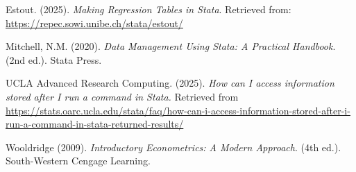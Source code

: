 \documentclass[
]{book}
\begin{document}
Estout. (2025). \emph{Making Regression Tables in Stata}. Retrieved from: \url{https://repec.sowi.unibe.ch/stata/estout/}

Mitchell, N.M. (2020). \emph{Data Management Using Stata: A Practical Handbook}. (2nd ed.). Stata Press.

UCLA Advanced Research Computing. (2025). \emph{How can I access information stored after I run a command in Stata.} Retrieved from \url{https://stats.oarc.ucla.edu/stata/faq/how-can-i-access-information-stored-after-i-run-a-command-in-stata-returned-results/}

Wooldridge (2009). \emph{Introductory Econometrics: A Modern Approach}. (4th ed.). South-Western Cengage Learning.


\end{document}

